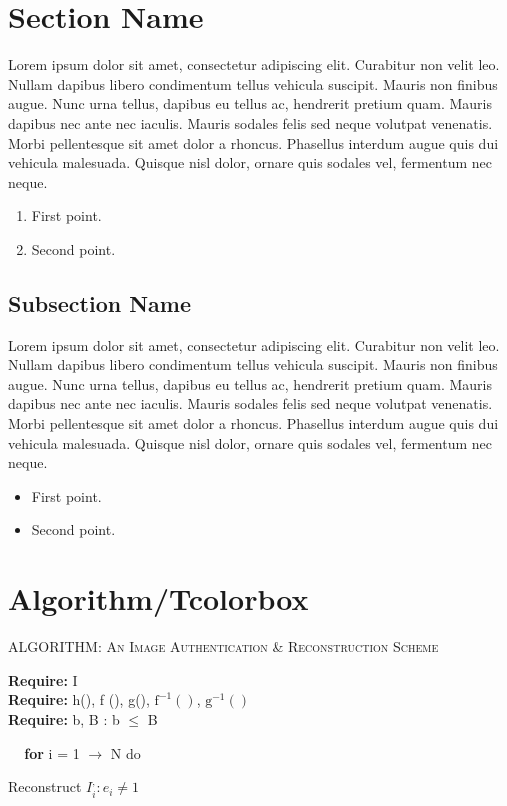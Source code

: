 \documentclass[12pt,a4paper]{report}
\begin{document}
\section{Section Name}
Lorem ipsum dolor sit amet, consectetur adipiscing elit. Curabitur non velit leo. Nullam dapibus libero condimentum tellus vehicula suscipit. Mauris non finibus augue. Nunc urna tellus, dapibus eu tellus ac, hendrerit pretium quam. Mauris dapibus nec ante nec iaculis. Mauris sodales felis sed neque volutpat venenatis. Morbi pellentesque sit amet dolor a rhoncus. Phasellus interdum augue quis dui vehicula malesuada. Quisque nisl dolor, ornare quis sodales vel, fermentum nec neque. 

\begin{enumerate}
\item First point.
\item Second point.
\end{enumerate}

\subsection{Subsection Name}
Lorem ipsum dolor sit amet, consectetur adipiscing elit. Curabitur non velit leo. Nullam dapibus libero condimentum tellus vehicula suscipit. Mauris non finibus augue. Nunc urna tellus, dapibus eu tellus ac, hendrerit pretium quam. Mauris dapibus nec ante nec iaculis. Mauris sodales felis sed neque volutpat venenatis. Morbi pellentesque sit amet dolor a rhoncus. Phasellus interdum augue quis dui vehicula malesuada. Quisque nisl dolor, ornare quis sodales vel, fermentum nec neque. 

\begin{itemize}
\item First point.
\item Second point.
\end{itemize}



\section{Algorithm/Tcolorbox}


\begin{tcolorbox}
\begin{tcolorbox}
\textsc{ALGORITHM:  An Image Authentication \& Reconstruction Scheme}
\end{tcolorbox}
\textbf{Require:} I\\
\textbf{Require:} h(), f (), g(), $ \mathrm{f^{-1}()} $, $ \mathrm{g^{-1}()} $\\
\textbf{Require:} b, B : b $ \leq $ B 

{$\;\;\;$}\hspace{1.cm} \textbf{for} i = 1 $ \rightarrow $ N do

Reconstruct $ I_i^, :e_i \neq 1  $ 
\end{tcolorbox}
\end{document}
